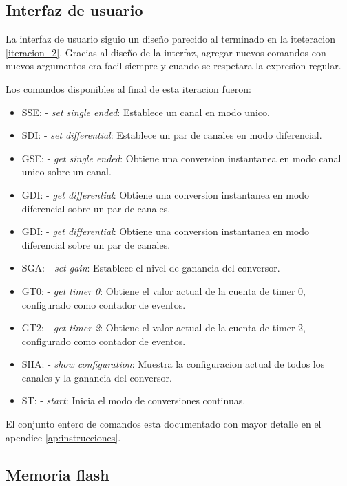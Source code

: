 

\subsection{Interfaz de usuario} %
\label{it5:sub:interfaz_de_usuario}

La interfaz de usuario siguio un diseño parecido al terminado en la iteteracion \ref{iteracion_2}. Gracias al diseño de la interfaz, agregar nuevos comandos con nuevos argumentos era facil siempre y cuando se respetara la expresion regular.

Los comandos disponibles al final de esta iteracion fueron:

\begin{itemize}
  \item SSE: - \textit{set single ended}: Establece un canal en modo unico.
  \item SDI: - \textit{set differential}: Establece un par de canales en modo diferencial.
  \item GSE: - \textit{get single ended}: Obtiene una conversion instantanea en modo canal unico sobre un canal.
  \item GDI: - \textit{get differential}: Obtiene una conversion instantanea en modo diferencial sobre un par de canales.
  \item GDI: - \textit{get differential}: Obtiene una conversion instantanea en modo diferencial sobre un par de canales.
  \item SGA: - \textit{set gain}: Establece el nivel de ganancia del conversor.
  \item GT0: - \textit{get timer 0}: Obtiene el valor actual de la cuenta de timer 0, configurado como contador de eventos.
  \item GT2: - \textit{get timer 2}: Obtiene el valor actual de la cuenta de timer 2, configurado como contador de eventos.
  \item SHA: - \textit{show configuration}: Muestra la configuracion actual de todos los canales y la ganancia del conversor.
  \item ST: - \textit{start}: Inicia el modo de conversiones continuas.
\end{itemize}

El conjunto entero de comandos esta documentado con mayor detalle en el apendice \ref{ap:instrucciones}.

\subsection{Memoria flash} %
\label{it5:sub:memoria_flash}

